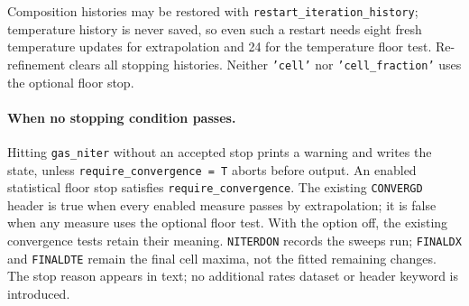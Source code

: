 \documentclass[english,a4paper]{my_memo}
\newcommand{\code}[1]{\texttt{#1}}
\begin{document}
Composition histories may be restored with
\code{restart\_iteration\_history}; temperature history is never saved,
so even such a restart needs eight fresh temperature updates for
extrapolation and 24 for the temperature floor test.  Re-refinement
clears all stopping histories.  Neither \code{'cell'} nor
\code{'cell\_fraction'} uses the optional floor stop.

\paragraph{When no stopping condition passes.}
Hitting \code{gas\_niter} without an accepted stop prints a warning
and writes the state, unless \code{require\_convergence = T} aborts
before output.  An enabled statistical floor stop satisfies
\code{require\_convergence}.  The existing \code{CONVERGD} header
is true when every enabled measure passes by extrapolation; it is false
when any measure uses the optional floor test.  With the option off,
the existing convergence tests retain their meaning.  \code{NITERDON} records the sweeps run;
\code{FINALDX} and \code{FINALDTE} remain the final cell maxima,
not the fitted remaining changes.  The stop reason appears in text;
no additional rates dataset or header keyword is introduced.
\end{document}
